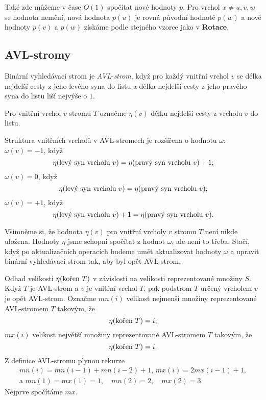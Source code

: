 \documentclass[a4paper,12pt]{article}
\begin{document}
Také zde můžeme v čase $O(1)$ spočítat nové hodnoty $
p$. 
Pro vrchol $x\ne u,v,w$ se hodnota nemění, nová hodnota 
$p(u)$ je 
rovná původní hodnotě $p(w)$ a nové hodnoty $
p(v)$ 
a $p(w)$ 
získáme pod\-le stejného vzorce  jako v {\bf Rotace}.

\subsection{AVL-stromy}

Binární vyhledávací strom je 
\emph{AVL}-\emph{strom}, když pro každý vnitř\-ní vrchol 
$v$ se délka nejdelší cesty z jeho levého syna do 
listu a délka nejdelší cesty z jeho pravého syna do listu 
liší nejvýše o $1$.  

Pro vnitřní vrchol $v$ stromu $T$ označme $\eta 
(v)$ 
délku nejdelší cesty z vrcholu $v$ do listu.

 

Struktura vnitřních vrcholů v 
AVL-stromech je rozšířena o hodnotu $\omega$:\newline 
$\omega (v)=-1$, když 
$$\eta (\text{\rm levý syn vrcholu }v)=\eta (\text{\rm pravý syn vrcholu }
v)+1;$$
$\omega (v)=0$, když 
$$\eta (\text{\rm levý syn vrcholu }v)=\eta (\text{\rm pravý syn vrcholu }
v);$$
$\omega (v)=+1$, když
$$\eta (\text{\rm levý syn vrcholu }v)+1=\eta (\text{\rm pravý syn vrcholu }
v).$$

Všimněme si, že hodnota $\eta (v)$ pro vnitřní vrcholy 
$v$ stromu $T$ není nikde uložena.  Hodnoty $\eta$ jsme schopni 
spočítat z hodnot $\omega$, ale není to třeba.  Stačí, když po 
aktualizačních operacích budeme umět aktualizovat 
hodnoty $\omega$ a upravit binární vy\-hledávací strom tak, 
aby byl opět AVL-strom.

Odhad velikosti $\eta (\text{\rm kořen }T)$ v závislosti na 
velikosti reprezentované množiny $S$.\newline 
Když $T$ je AVL-strom a $v$ je vnitřní vrchol $T$, pak 
podstrom $T$ určený vrcholem $v$ je opět AVL-strom. 
Označme\newline 
$mn(i)$ velikost nejmenší množiny reprezentované 
AVL-stromem $T$ takovým, že $$\eta (\text{\rm kořen }T)=i,$$ 
$mx(i)$ velikost největší množiny reprezentované 
AVL-stromem $T$ takovým, že $$\eta (\text{\rm kořen }T)=i.$$ 
Z definice AVL-stromu plynou rekurze
\begin{gather*} mn(i)=mn(i-1)+mn(i-2)+1,\,mx(i)=2mx(i-1)+1,\\
\text{a }mn(1)=mx(1)=1,\quad mn(2)=2,\quad mx(2)=3.\end{gather*}
Nejprve spočítáme $mx$.
\end{document}
